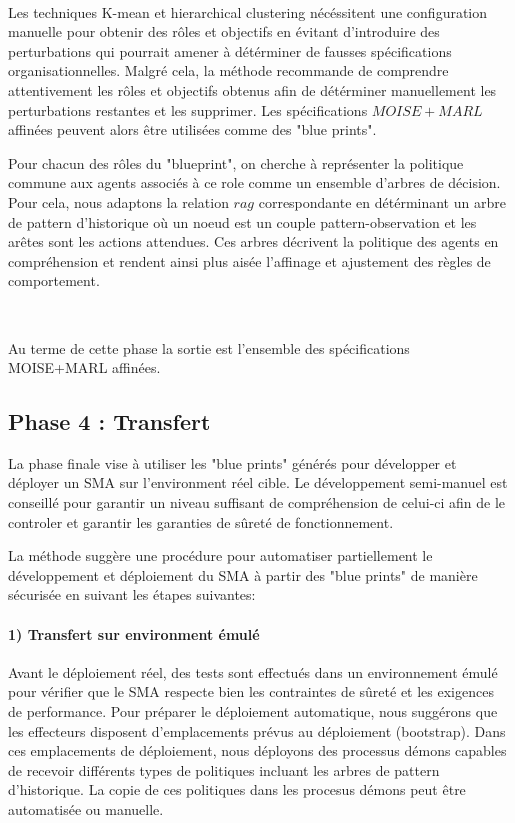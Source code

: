 \documentclass[sigconf,anonymous]{aamas}
\begin{document}
\

Les techniques K-mean et hierarchical clustering nécéssitent une configuration manuelle pour obtenir des rôles et objectifs en évitant d'introduire des perturbations qui pourrait amener à détérminer de fausses spécifications organisationnelles. Malgré cela, la méthode recommande de comprendre attentivement les rôles et objectifs obtenus afin de détérminer manuellement les perturbations restantes et les supprimer. Les spécifications $MOISE+MARL$ affinées peuvent alors être utilisées comme des "blue prints".

Pour chacun des rôles du "blueprint", on cherche à représenter la politique commune aux agents associés à ce role comme un ensemble d'arbres de décision. Pour cela, nous adaptons la relation $rag$ correspondante en détérminant un arbre de pattern d'historique où un noeud est un couple pattern-observation et les arêtes sont les actions attendues. Ces arbres décrivent la politique des agents en compréhension et rendent ainsi plus aisée l'affinage et ajustement des règles de comportement.

\

Au terme de cette phase la sortie est l'ensemble des spécifications MOISE+MARL affinées.

\subsection{Phase 4 : Transfert}

La phase finale vise à utiliser les "blue prints" générés pour développer et déployer un SMA sur l'environment réel cible. Le développement semi-manuel est conseillé pour garantir un niveau suffisant de compréhension de celui-ci afin de le controler et garantir les garanties de sûreté de fonctionnement.

La méthode suggère une procédure pour automatiser partiellement le développement et déploiement du SMA à partir des "blue prints" de manière sécurisée en suivant les étapes suivantes:

\paragraph{\textbf{1) Transfert sur environment émulé}}

Avant le déploiement réel, des tests sont effectués dans un environnement émulé pour vérifier que le SMA respecte bien les contraintes de sûreté et les exigences de performance. Pour préparer le déploiement automatique, nous suggérons que les effecteurs disposent d'emplacements prévus au déploiement (bootstrap). Dans ces emplacements de déploiement, nous déployons des processus démons capables de recevoir différents types de politiques incluant les arbres de pattern d'historique. La copie de ces politiques dans les procesus démons peut être automatisée ou manuelle.
\end{document}
